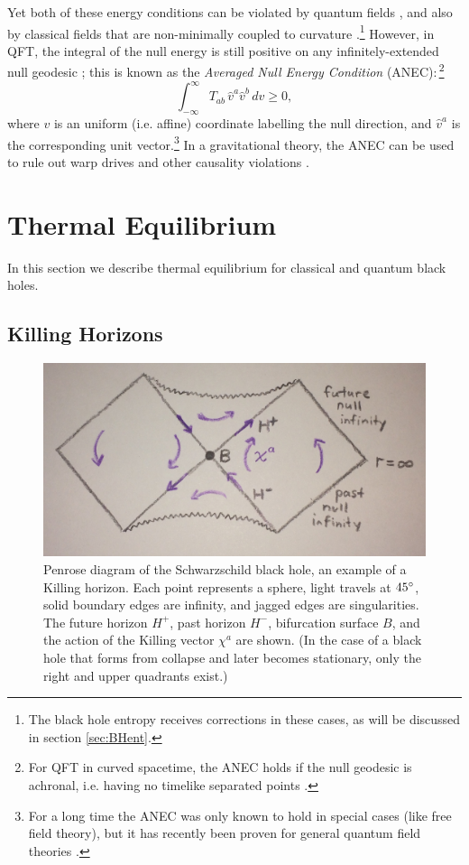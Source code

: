 \documentclass[12pt]{article}
\def\be{\begin{equation}}
\def\ee{\end{equation}}
\begin{document}
\noindent Yet both of these energy conditions can be violated by quantum fields \cite{epstein1965nonpositivity}, and also by classical fields that are non-minimally coupled to curvature \cite{flanagan1996does}.\footnote{The black hole entropy receives corrections in these cases, as will be discussed in section \ref{sec:BHent}.}  However, in QFT, the integral of the null energy is still positive on any infinitely-extended null geodesic  \cite{borde1987geodesic}; this is known as the \emph{Averaged Null Energy Condition} (ANEC):\,\footnote{For QFT in curved spacetime, the ANEC holds if the null geodesic is achronal, i.e. having no timelike separated points \cite{graham2007achronal,Kontou:2015yha}.}
\be\label{ANEC}
\int_{-\infty}^{\infty} T_{ab} \,\hat{v}^a \hat{v}^b\,dv \ge 0,
\ee
where $v$ is an uniform (i.e. affine) coordinate labelling the null direction, and $\hat{v}^a$ is the corresponding unit vector.\footnote{For a long time the ANEC was only known to hold in special cases (like free field theory), but it has recently been proven for general quantum field theories \cite{Tom1,Tom2}.}  In a gravitational theory, the ANEC can be used to rule out warp drives and other causality violations \cite{Gao:2000ga}.

\section{Thermal Equilibrium} \label{sec:thermal}

In this section we describe thermal equilibrium for classical and quantum black holes.

\subsection{Killing Horizons} \label{sec:killing}

\begin{figure}[ht]
\centering
\includegraphics[width=.8\textwidth]{Killing.jpg}
\caption{\small Penrose diagram of the Schwarzschild black hole, an example of a Killing horizon.  Each point represents a sphere, light travels at $45\degree$, solid boundary edges are infinity, and jagged edges are singularities.  The future horizon $H^+$, past horizon $H^-$, bifurcation surface $B$, and the action of the Killing vector $\chi^a$ are shown.  (In the case of a black hole that forms from collapse and later becomes stationary, only the right and upper quadrants exist.)}\label{fig:Killing}
\end{figure}
\end{document}
